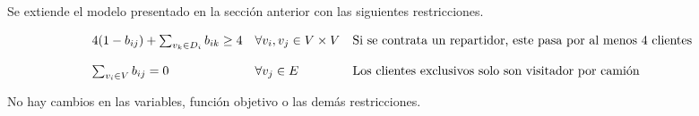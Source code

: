 \documentclass[10pt,a4paper]{article}
\begin{document}
	Se extiende el modelo presentado en la sección anterior con las siguientes restricciones.
	
		\[
	\begin{array}{l l l}
		4(1 - b_{ij}) + \sum_{v_k \in D_i} b_{ik} \geq 4 & \forall v_i, v_j \in V \times V & \text{Si se contrata un repartidor, este pasa por al menos 4 clientes} \\
		\\
		\sum_{v_i \in V}  b_{ij} = 0 & \forall v_j \in E  & \text{Los clientes exclusivos solo son visitador por camión} \\
	\end{array}
	\]
	
	No hay cambios en las variables, función objetivo o las demás restricciones.
\end{document}
